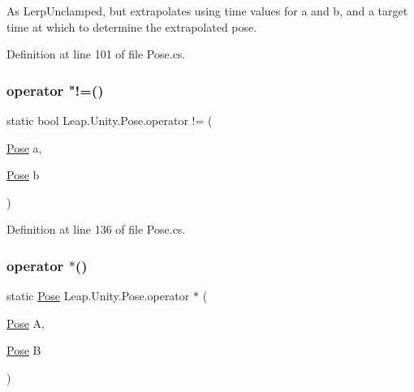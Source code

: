 As Lerp\+Unclamped, but extrapolates using time values for a and b, and a target time at which to determine the extrapolated pose. 



Definition at line 101 of file Pose.\+cs.

\mbox{\label{struct_leap_1_1_unity_1_1_pose_a5eb039dbc9e70537da843e3eb92adcb4}} 
\subsubsection{\texorpdfstring{operator "!=()}{operator !=()}}
{\footnotesize\ttfamily static bool Leap.\+Unity.\+Pose.\+operator != (\begin{DoxyParamCaption}\item[{\mbox{\hyperlink{struct_leap_1_1_unity_1_1_pose}{Pose}}}]{a,  }\item[{\mbox{\hyperlink{struct_leap_1_1_unity_1_1_pose}{Pose}}}]{b }\end{DoxyParamCaption})\hspace{0.3cm}{\ttfamily [static]}}



Definition at line 136 of file Pose.\+cs.

\mbox{\label{struct_leap_1_1_unity_1_1_pose_adc1395f4c9a4caef84c6986ce49c7ab7}} 
\subsubsection{\texorpdfstring{operator $\ast$()}{operator *()}\hspace{0.1cm}{\footnotesize\ttfamily [1/2]}}
{\footnotesize\ttfamily static \mbox{\hyperlink{struct_leap_1_1_unity_1_1_pose}{Pose}} Leap.\+Unity.\+Pose.\+operator $\ast$ (\begin{DoxyParamCaption}\item[{\mbox{\hyperlink{struct_leap_1_1_unity_1_1_pose}{Pose}}}]{A,  }\item[{\mbox{\hyperlink{struct_leap_1_1_unity_1_1_pose}{Pose}}}]{B }\end{DoxyParamCaption})\hspace{0.3cm}{\ttfamily [static]}}



